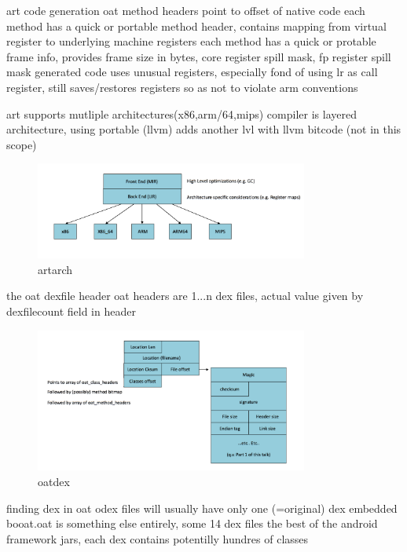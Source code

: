 art code generation
oat method headers point to offset of native code
each method has a quick or portable method header, contains mapping from virtual register to underlying machine registers
each method has a quick or protable frame info, provides frame size in bytes, core register spill mask, fp register spill mask
generated code uses unusual registers, especially fond of using lr as call register, still saves/restores registers so as not to violate arm conventions
\newline

art supports mutliple architectures(x86,arm/64,mips)
compiler is layered architecture, using portable (llvm) adds another lvl with llvm bitcode (not in this scope)
\begin{figure}[h]
    \centering
    \includegraphics[width=0.8\textwidth]{data/artarch.png}
    \caption{artarch}
    \label{fig:artarch}
\end{figure}

the oat dexfile header
oat headers are 1...n dex files, actual value given by dexfilecount field in header
\begin{figure}[h]
    \centering
    \includegraphics[width=0.8\textwidth]{data/oatdex.png}
    \caption{oatdex}
    \label{fig:awesome_image122223}
\end{figure}


finding dex in oat
odex files will usually have only one (=original) dex embedded
booat.oat is something else entirely, some 14 dex files the best of the android framework jars, each dex contains potentilly hundres of classes



